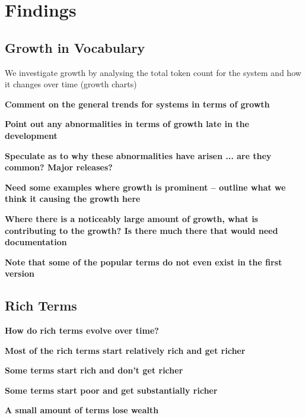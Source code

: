 \chapter{Findings}
\label{chapter:Findings}

\section{Growth in Vocabulary} %
\label{sec:growth_in_vocabulary}

We investigate growth by analysing the total token count for the system and how it changes over time (growth charts)

\textbf{Comment on the general trends for systems in terms of growth}

\textbf{Point out any abnormalities in terms of growth late in the development}

\textbf{Speculate as to why these abnormalities have arisen ... are they common? Major releases?}

\textbf{Need some examples where growth is prominent -- outline what we think it causing the growth here}

\textbf{Where there is a noticeably large amount of growth, what is contributing to the growth? Is there much there that would need documentation}

\textbf{Note that some of the popular terms do not even exist in the first version}


\section{Rich Terms} %
\label{sec:rich_terms}

\textbf{How do rich terms evolve over time?}

\textbf{Most of the rich terms start relatively rich and get richer}

\textbf{Some terms start rich and don't get richer}

\textbf{Some terms start poor and get substantially richer}

\textbf{A small amount of terms lose wealth}


% 
% 


